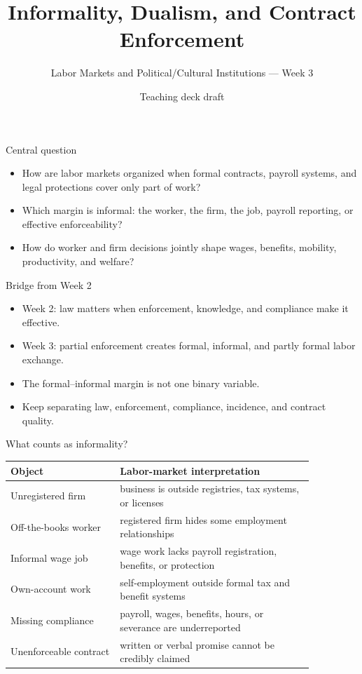 \documentclass[aspectratio=169,11pt]{beamer}
\title{Informality, Dualism, and Contract Enforcement}
\subtitle{Labor Markets and Political/Cultural Institutions --- Week 3}
\author{Teaching deck draft}
\date{}
\begin{document}
\begin{frame}
  \titlepage
\end{frame}

\begin{frame}{Central question}
\begin{itemize}
    \item How are labor markets organized when formal contracts, payroll systems, and legal protections cover only part of work?
    \item Which margin is informal: the worker, the firm, the job, payroll reporting, or effective enforceability?
    \item How do worker and firm decisions jointly shape wages, benefits, mobility, productivity, and welfare?
\end{itemize}
\end{frame}

\begin{frame}{Bridge from Week 2}
\begin{itemize}
    \item Week 2: law matters when enforcement, knowledge, and compliance make it effective.
    \item Week 3: partial enforcement creates formal, informal, and partly formal labor exchange.
    \item The formal--informal margin is not one binary variable.
    \item Keep separating law, enforcement, compliance, incidence, and contract quality.
\end{itemize}
\end{frame}

\begin{frame}{What counts as informality?}
\small
\begin{tabular}{p{0.31\linewidth} p{0.55\linewidth}}
\toprule
Object & Labor-market interpretation \\
\midrule
Unregistered firm & business is outside registries, tax systems, or licenses \\
Off-the-books worker & registered firm hides some employment relationships \\
Informal wage job & wage work lacks payroll registration, benefits, or protection \\
Own-account work & self-employment outside formal tax and benefit systems \\
Missing compliance & payroll, wages, benefits, hours, or severance are underreported \\
Unenforceable contract & written or verbal promise cannot be credibly claimed \\
\bottomrule
\end{tabular}
\end{frame}
\end{document}
